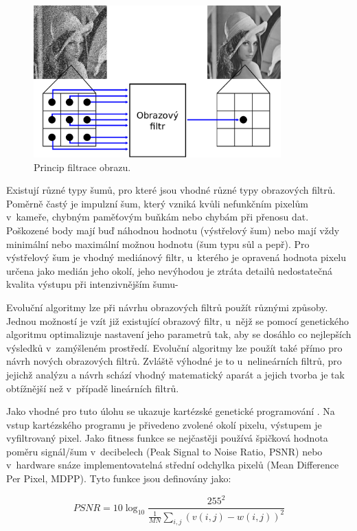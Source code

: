 \begin{figure}[htb]
    \centering\includegraphics[width=0.85\textwidth]{fig/filter.pdf}
    \caption{Princip filtrace obrazu.}
    \label{obrIFokoli}
\end{figure}

Existují různé typy šumů, pro které jsou vhodné různé typy obrazových filtrů. Poměrně častý je impulzní šum, který vzniká kvůli nefunkčním pixelům v~kameře, chybným paměťovým buňkám nebo chybám při přenosu dat. Poškozené body mají buď náhodnou hodnotu (výstřelový šum) nebo mají vždy minimální nebo maximální možnou hodnotu (šum typu sůl a pepř). Pro výstřelový šum je vhodný mediánový filtr, u~kterého je opravená hodnota pixelu určena jako medián jeho okolí, jeho nevýhodou je ztráta detailů nedostatečná kvalita výstupu při intenzivnějším šumu-

Evoluční algoritmy lze při návrhu obrazových filtrů použít různými způsoby. Jednou možností je vzít již existující obrazový filtr, u~nějž se pomocí genetického algoritmu optimalizuje nastavení jeho parametrů tak, aby se dosáhlo co nejlepších výsledků v~zamýšleném prostředí. Evoluční algoritmy lze použít také přímo pro návrh nových obrazových filtrů. Zvláště výhodné je to u~nelineárních filtrů, pro jejichž analýzu a návrh schází vhodný matematický aparát a jejich tvorba je tak obtížnější než v~případě lineárních filtrů.

Jako vhodné pro tuto úlohu se ukazuje kartézské genetické programování \cite{ZelenaIF}. Na vstup kartézského programu je přivedeno zvolené okolí pixelu, výstupem je vyfiltrovaný pixel. Jako fitness funkce se nejčastěji používá špičková hodnota poměru signál/šum v~decibelech (Peak Signal to Noise Ratio, PSNR) nebo v~hardware snáze implementovatelná střední odchylka pixelů (Mean Difference Per Pixel, MDPP). Tyto funkce jsou definovány jako:

\begin{equation}
    \label{eqPSNR}
    \mathit{PSNR} = 10 \log_{10} \frac{255^2}{\frac{1}{MN} \sum\limits_{i,j} \left( v\left( i, j \right) - w\left( i, j \right)  \right)^2 }
\end{equation}

